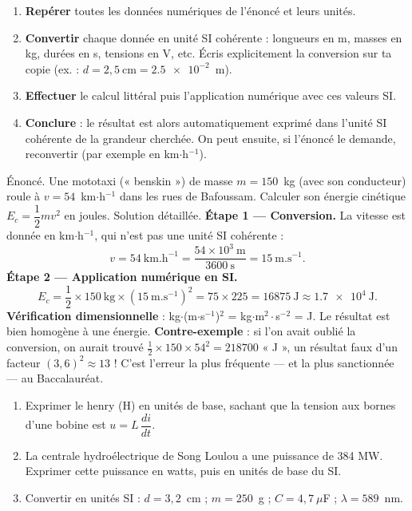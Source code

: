 \documentclass[11pt]{article}
\begin{document}
\begin{methode}
\begin{enumerate}
\item \textbf{Repérer} toutes les données numériques de l'énoncé et leurs unités.
\item \textbf{Convertir} chaque donnée en unité SI cohérente : longueurs en m, masses en kg, durées en s, tensions en V, etc. Écris explicitement la conversion sur ta copie (ex. : $d = 2{,}5~\mathrm{cm} = \num{2,5e-2}$~m).
\item \textbf{Effectuer} le calcul littéral puis l'application numérique avec ces valeurs SI.
\item \textbf{Conclure} : le résultat est alors automatiquement exprimé dans l'unité SI cohérente de la grandeur cherchée. On peut ensuite, si l'énoncé le demande, reconvertir (par exemple en km$\cdot$h$^{-1}$).
\end{enumerate}
\end{methode}

\begin{exoresolu}
Énoncé. Une mototaxi (« benskin ») de masse $m = 150$~kg (avec son conducteur) roule à $v = 54$~km$\cdot$h$^{-1}$ dans les rues de Bafoussam. Calculer son énergie cinétique $E_c = \dfrac{1}{2}mv^2$ en joules.
\tcblower
Solution détaillée. \textbf{Étape 1 — Conversion.} La vitesse est donnée en km$\cdot$h$^{-1}$, qui n'est pas une unité SI cohérente :
\[ v = 54~\mathrm{km.h^{-1}} = \frac{54 \times 10^{3}~\mathrm{m}}{3600~\mathrm{s}} = 15~\mathrm{m.s^{-1}}. \]
\textbf{Étape 2 — Application numérique en SI.}
\[ E_c = \frac{1}{2} \times 150~\mathrm{kg} \times (15~\mathrm{m.s^{-1}})^{2} = 75 \times 225 = \num{16875}~\mathrm{J} \approx \num{1,7e4}~\mathrm{J}. \]
\textbf{Vérification dimensionnelle} : kg$\cdot$(m$\cdot$s$^{-1}$)$^{2}$ = kg$\cdot$m$^{2}\cdot$s$^{-2}$ = J. Le résultat est bien homogène à une énergie.
\textbf{Contre-exemple} : si l'on avait oublié la conversion, on aurait trouvé $\tfrac{1}{2}\times 150 \times 54^{2} = \num{218700}$ « J », un résultat faux d'un facteur $(3,6)^2 \approx 13$ ! C'est l'erreur la plus fréquente — et la plus sanctionnée — au Baccalauréat.
\end{exoresolu}

\begin{exercice}
\begin{enumerate}
\item Exprimer le henry (H) en unités de base, sachant que la tension aux bornes d'une bobine est $u = L\,\dfrac{di}{dt}$.
\item La centrale hydroélectrique de Song Loulou a une puissance de 384 MW. Exprimer cette puissance en watts, puis en unités de base du SI.
\item Convertir en unités SI : $d = 3{,}2$~cm ; $m = 250$~g ; $C = 4{,}7~\mu$F ; $\lambda = 589$~nm.
\end{enumerate}
\end{exercice}
\end{document}
